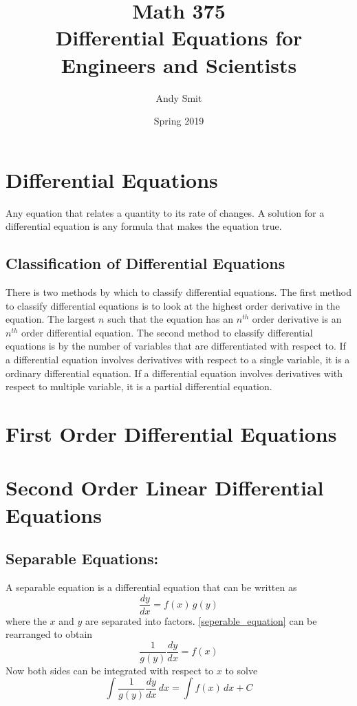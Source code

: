 \documentclass[14pt]{article}
\title{Math 375\\Differential Equations for Engineers and Scientists}
\author{Andy Smit}
\date{Spring 2019}
\begin{document}
    \maketitle
    \section{Differential Equations}
    Any equation that relates a quantity to its rate of changes.
    A solution for a differential equation is any formula that makes the
    equation true.
    \subsection{Classification of Differential Equations}
    There is two methods by which to classify differential equations.
    The first method to classify differential equations is to look at
    the highest order derivative in the equation.
    The largest $n$ such that the equation has an $n^{th}$ order
    derivative is an $n^{th}$ order differential equation.
    The second method to classify differential equations is by the
    number of variables that are differentiated with respect to.
    If a differential equation involves derivatives with respect to a
    single variable, it is a ordinary differential equation.
    If a differential equation involves derivatives with respect to
    multiple variable, it is a partial differential equation.
    \section{First Order Differential Equations}
    \section{Second Order Linear Differential Equations}
    \subsection{Separable Equations:}
    A separable equation is a differential equation that can be written 
    as
    \begin{equation}\label{seperable_equation}
        \frac{dy}{dx}=f(x)\,g(y)
    \end{equation}
    where the $x$ and $y$ are separated into factors.
    \eqref{seperable_equation} can be rearranged to obtain
    $$\frac{1}{g(y)}\frac{dy}{dx}=f(x)$$
    Now both sides can be integrated with respect to $x$ to solve
    $$\int\frac{1}{g(y)}\frac{dy}{dx}\,dx=\int f(x)\,dx+C$$
\end{document}
